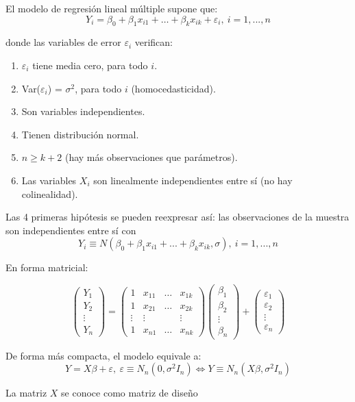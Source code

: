 El modelo de regresión lineal múltiple supone que:
\[Y_i=β_0+β_1x_{i1}+…+β_kx_{ik}+ε_i,\ i=1,...,n\]

donde las variables de error $ε_i$ verifican:
\begin{enumerate}
\item $ε_i$ tiene media cero, para todo $i$.
\item Var($ε_i$) = $σ^2$, para todo $i$ (homocedasticidad).
\item Son variables independientes.
\item Tienen distribución normal.
\item $n ≥ k + 2$ (hay más observaciones que parámetros).
\item Las variables $X_i$ son linealmente independientes entre sí (no hay colinealidad).
\end{enumerate}

Las 4 primeras hipótesis se pueden reexpresar así: las observaciones de la muestra son independientes entre sí con
\[Y_i \equiv N(β_0 +β_1x_{i1} +...+β_kx_{ik},σ),\ i=1,...,n\]

En forma matricial:

\[
	\begin{pmatrix}
		Y_1\\
		Y_2\\
		\vdots \\
		Y_n
	\end{pmatrix}
	=
	\begin{pmatrix}
		1 & x_{11} & … & x_{1k} \\
		1 & x_{21} & … & x_{2k} \\
		\vdots & \vdots &  & \vdots \\
		1 & x_{n1} & … & x_{nk}
	\end{pmatrix}
	\begin{pmatrix}
		β_1\\
		β_2\\
		\vdots \\
		β_n
	\end{pmatrix}
	+
	\begin{pmatrix}
		ε_1\\
		ε_2\\
		\vdots \\
		ε_n
	\end{pmatrix}
\]


De forma más compacta, el modelo equivale a:
\[Y =Xβ+ε,\ ε \equiv N_n(0,σ^2I_n) \iff Y \equiv N_n(Xβ,σ^2I_n)\]

\begin{defn}
	La matriz $X$ se conoce como matriz de diseño
\end{defn}

